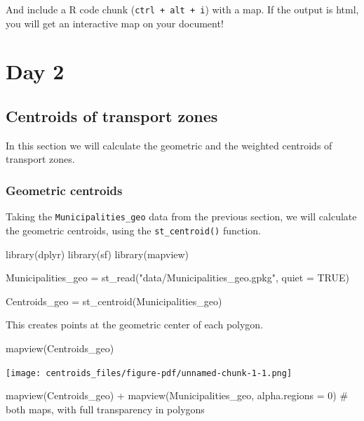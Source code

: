\documentclass[
  letterpaper,
  DIV=11,
  numbers=noendperiod]{scrreprt}
\newenvironment{Shaded}{\begin{snugshade}}{\end{snugshade}}
\newcommand{\AttributeTok}[1]{\textcolor[rgb]{0.40,0.45,0.13}{#1}}
\newcommand{\CommentTok}[1]{\textcolor[rgb]{0.37,0.37,0.37}{#1}}
\newcommand{\ConstantTok}[1]{\textcolor[rgb]{0.56,0.35,0.01}{#1}}
\newcommand{\DecValTok}[1]{\textcolor[rgb]{0.68,0.00,0.00}{#1}}
\newcommand{\FunctionTok}[1]{\textcolor[rgb]{0.28,0.35,0.67}{#1}}
\newcommand{\NormalTok}[1]{\textcolor[rgb]{0.00,0.23,0.31}{#1}}
\newcommand{\OtherTok}[1]{\textcolor[rgb]{0.00,0.23,0.31}{#1}}
\newcommand{\SpecialCharTok}[1]{\textcolor[rgb]{0.37,0.37,0.37}{#1}}
\newcommand{\StringTok}[1]{\textcolor[rgb]{0.13,0.47,0.30}{#1}}
\begin{document}
And include a R code chunk (\texttt{ctrl\ +\ alt\ +\ i}) with a map. If
the output is html, you will get an interactive map on your document!

\part{\textbf{Day 2}}

\chapter{Centroids of transport
zones}\label{centroids-of-transport-zones}

In this section we will calculate the geometric and the weighted
centroids of transport zones.

\section{Geometric centroids}\label{geometric-centroids}

Taking the \texttt{Municipalities\_geo} data from the previous section,
we will calculate the geometric centroids, using the
\texttt{st\_centroid()} function.

\begin{Shaded}
\begin{Highlighting}[]
\FunctionTok{library}\NormalTok{(dplyr)}
\FunctionTok{library}\NormalTok{(sf)}
\FunctionTok{library}\NormalTok{(mapview)}

\NormalTok{Municipalities\_geo }\OtherTok{=} \FunctionTok{st\_read}\NormalTok{(}\StringTok{"data/Municipalities\_geo.gpkg"}\NormalTok{, }\AttributeTok{quiet =} \ConstantTok{TRUE}\NormalTok{)}

\NormalTok{Centroids\_geo }\OtherTok{=} \FunctionTok{st\_centroid}\NormalTok{(Municipalities\_geo)}
\end{Highlighting}
\end{Shaded}

This creates points at the geometric center of each polygon.

\begin{Shaded}
\begin{Highlighting}[]
\FunctionTok{mapview}\NormalTok{(Centroids\_geo)}
\end{Highlighting}
\end{Shaded}

\texttt{[image: centroids\_files/figure-pdf/unnamed-chunk-1-1.png]}

\begin{Shaded}
\begin{Highlighting}[]
\FunctionTok{mapview}\NormalTok{(Centroids\_geo) }\SpecialCharTok{+} \FunctionTok{mapview}\NormalTok{(Municipalities\_geo, }\AttributeTok{alpha.regions =} \DecValTok{0}\NormalTok{) }\CommentTok{\# both maps, with full transparency in polygons}
\end{Highlighting}
\end{Shaded}
\end{document}
